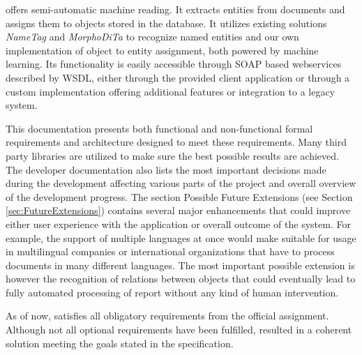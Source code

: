 \textan{} offers semi-automatic machine reading.
It extracts entities from documents and assigns them to objects
stored in the database. It utilizes existing solutions \emph{NameTag} and
\emph{MorphoDiTa} to recognize named entities and our own
implementation of object to entity assignment, both powered by machine learning.
Its functionality is easily accessible through SOAP based webservices described by
WSDL, either through the provided client application or through a custom
implementation offering additional features or integration to a legacy system.

This documentation presents both functional and non-functional formal requirements
and architecture designed to meet these requirements. Many third party libraries
are utilized to make sure the best possible results are achieved. The developer
documentation also lists the most important decisions made during the
development affecting various parts of the project and overall overview of the
development progress. The section Possible Future Extensions (see Section
\ref{sec:FutureExtensions}) contains several major enhancements that could improve
either user experience with the application or overall outcome of the system. For
example, the support of multiple languages at once would make \textan{} suitable
for usage in multilingual companies or international organizations that have to
process documents in many different languages. The most important possible
extension is however the recognition of relations between objects that could
eventually lead to fully automated processing of report without any kind of human
intervention.

As of now, \textan{} satisfies all obligatory requirements from the official
assignment. Although not all optional requirements have been fulfilled, \textan{}
resulted in a coherent solution meeting the goals stated in the specification.
